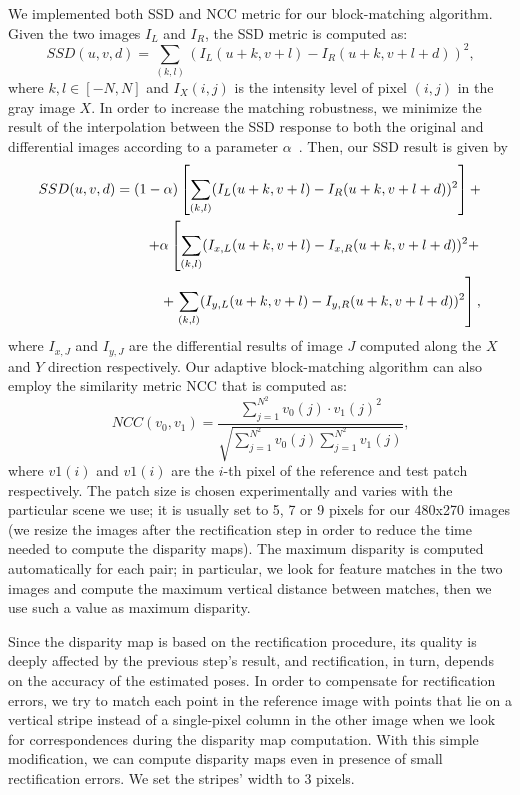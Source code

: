 We implemented both SSD and NCC metric for our block-matching algorithm.
Given the two images $I_L$ and $I_R$, the SSD metric is computed as:
%
\begin{equation*}
SSD(u, v, d) = \sum_{(k, l)}(I_L(u + k, v + l) - I_R(u + k, v + l + d))^2	\textit{,}
\end{equation*}
%
\noindent where $k, l \in [-N, N]$ and $I_X(i, j)$ is the intensity level
of pixel $(i,j)$ in the gray image $X$.
%
In order to increase the matching robustness, we minimize the result of the
interpolation between the SSD response to both the original and differential 
images according to a parameter $\alpha$~\cite{BMVC.25.14:abbreviated}.
%
Then, our SSD result is given by
%
\begin{equation*}
\begin{split}
SSD(u, v, d) = (1 - \alpha) \left[ \sum_{(k, l)}(I_L(u + k, v + l) - I_R(u + k, v + l + d))^2\right] + \\
	 + \alpha\left[ \sum_{(k, l)}(I_{x,L}(u + k, v + l) - I_{x,R}(u + k, v + l + d))^2 + \right. \\
	 + \left. \sum_{(k, l)}(I_{y,L}(u + k, v + l) - I_{y,R}(u + k, v + l + d))^2 \vphantom{\sum_{(k, l)}} \right] \text{,}
\end{split}
\end{equation*}
%
\noindent where $I_{x, J}$ and $I_{y, J}$ are the differential results of image $J$
computed along the $X$ and $Y$ direction respectively.
%
Our adaptive block-matching algorithm can also employ the similarity metric
NCC that is computed as:
%
\begin{equation*}
NCC(v_0, v_1) = \frac{\sum_{j = 1}^{N^2}v_0(j) \cdot v_1(j)^2}{\sqrt{\sum_{j = 1}^{N^2}v_0(j)\sum_{j = 1}^{N^2}v_1(j)}}	\textit{,}
\end{equation*}
\noindent where $v1(i)$ and $v1(i)$ are the $i$-th pixel of the reference and
test patch respectively.
The patch size is chosen experimentally and varies with the particular scene
we use; it is usually set to 5, 7 or 9 pixels for our 480x270 images
(we resize the images after the rectification step in order to reduce the 
time needed to compute the disparity maps).
The maximum disparity is computed automatically for each pair; in particular,
we look for feature matches in the two images and compute the maximum vertical
distance between matches, then we use such a value as maximum disparity.

Since the disparity map is based on the rectification procedure, its quality
is deeply affected by the previous step's result, and rectification, in turn,
depends on the accuracy of the estimated poses. In order to compensate for
rectification errors, we try to match each point in the reference image with points that
lie on a vertical stripe instead of a single-pixel column in the other image
when we look for correspondences during the disparity map
computation. With this simple modification, we can compute disparity maps
even in presence of small rectification errors. We set the stripes' width to 3
pixels.


